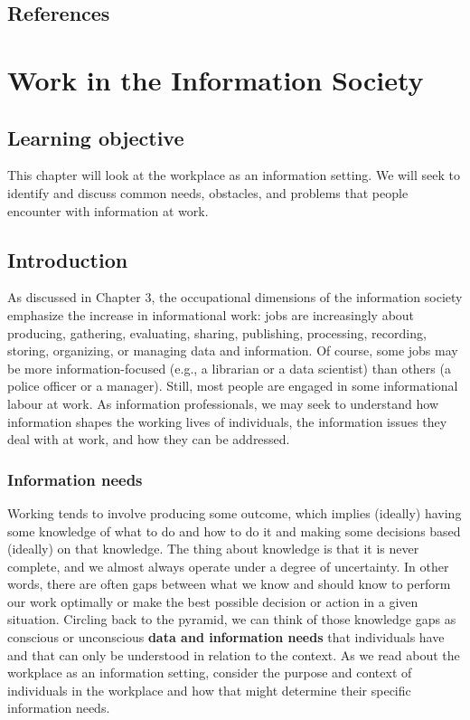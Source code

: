 \documentclass[
  letterpaper,
  DIV=11,
  numbers=noendperiod]{scrreprt}
\begin{document}
\section{References}\label{references-3}


\chapter{Work in the Information
Society}\label{work-in-the-information-society}

\section{Learning objective}\label{learning-objective}

This chapter will look at the workplace as an information setting. We
will seek to identify and discuss common needs, obstacles, and problems
that people encounter with information at work.

\section{Introduction}\label{introduction}

As discussed in Chapter 3, the occupational dimensions of the
information society emphasize the increase in informational work: jobs
are increasingly about producing, gathering, evaluating, sharing,
publishing, processing, recording, storing, organizing, or managing data
and information. Of course, some jobs may be more information-focused
(e.g., a librarian or a data scientist) than others (a police officer or
a manager). Still, most people are engaged in some informational labour
at work. As information professionals, we may seek to understand how
information shapes the working lives of individuals, the information
issues they deal with at work, and how they can be addressed.

\subsection{Information needs}\label{information-needs}

Working tends to involve producing some outcome, which implies (ideally)
having some knowledge of what to do and how to do it and making some
decisions based (ideally) on that knowledge. The thing about knowledge
is that it is never complete, and we almost always operate under a
degree of uncertainty. In other words, there are often gaps between what
we know and should know to perform our work optimally or make the best
possible decision or action in a given situation. Circling back to the
pyramid, we can think of those knowledge gaps as conscious or
unconscious \textbf{data and information needs} that individuals have
and that can only be understood in relation to the context. As we read
about the workplace as an information setting, consider the purpose and
context of individuals in the workplace and how that might determine
their specific information needs.
\end{document}

